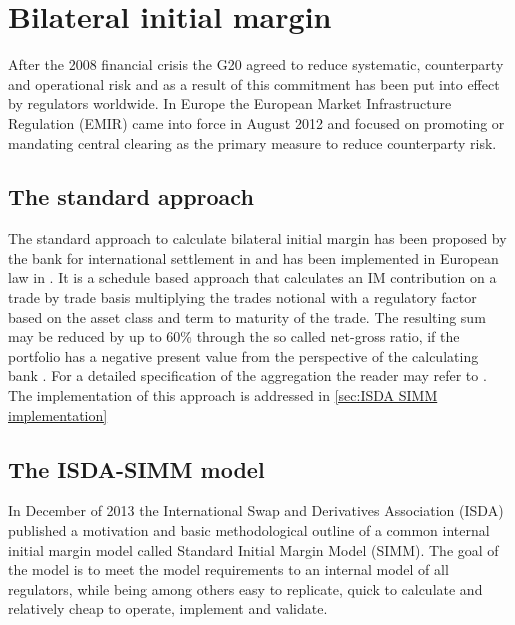 \documentclass[../Thesis_AHoecherl.tex]{subfiles}
\begin{document}
    \section{Bilateral initial margin}\label{Bilateral initial margin}
    
    After the 2008 financial crisis the G20 agreed to reduce systematic, counterparty and operational risk and as a result of this commitment has been put into effect by regulators worldwide. In Europe the European Market Infrastructure Regulation (EMIR) came into force in August 2012 and focused on promoting or mandating central clearing as the primary measure to reduce counterparty risk.

    \subsection{The standard approach}\label{The standard approach}


    The standard approach to calculate bilateral initial margin has been proposed by the bank for international settlement in  and has been implemented in European law in . It is a schedule based approach that calculates an \gls{IM} contribution on a trade by trade basis multiplying the trades notional with a regulatory factor based on the asset class and term to maturity of the trade.
    The resulting sum may be reduced by up to 60\% through the so called net-gross ratio, if the portfolio has a negative present value from the perspective of the calculating bank .
    For a detailed specification of the aggregation the reader may refer to . The implementation of this approach is addressed in \ref{sec:ISDA SIMM implementation} 
    
    \subsection{The ISDA-SIMM model}
    In December of 2013 the International Swap and Derivatives Association (ISDA) published a motivation and basic methodological outline of a common internal initial margin model called Standard Initial Margin Model (SIMM\texttrademark)\cite{ISDADec2013}. The goal of the model is to meet the model requirements to an internal model of all regulators, while being among others easy to replicate, quick to calculate and relatively cheap to operate, implement and validate.
\end{document}
